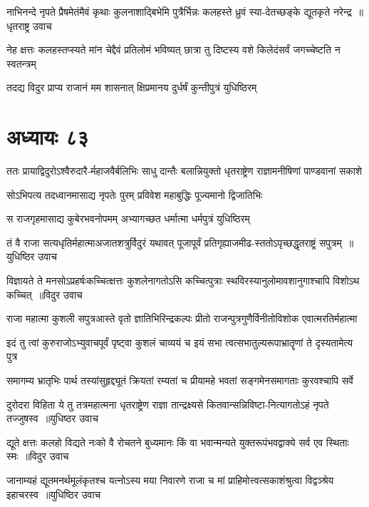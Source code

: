 \threelineshloka
{नाभिनन्दे नृपते प्रैषमेतंमैवं कृथाः कुलनाशाद्बिभेमि}
{पुत्रैर्भिन्नः कलहस्ते ध्रुवं स्या-देतच्छङ्के द्यूतकृते नरेन्द्र ॥धृतराष्ट्र उवाच}
{}


\twolineshloka
{नेह क्षत्तः कलहस्तप्स्यते मांन चेद्दैवं प्रतिलोमं भविष्यत्}
{छात्रा तु दिष्टस्य वशे किलेदंसर्वं जगच्चेष्टति न स्वतन्त्रम्}


\twolineshloka
{तदद्य विदुर प्राप्य राजानं मम शासनात्}
{क्षिप्रमानय दुर्धर्षं कुन्तीपुत्रं युधिष्ठिरम्}


\chapter{अध्यायः ८३}
\twolineshloka
{ततः प्रायाद्विदुरोऽश्वैरुदारै-र्महाजवैर्बलिभिः साधु दान्तैः}
{बलान्नियुक्तो धृतराष्ट्रेण राज्ञामनीषिणां पाण्डवानां सकाशे}


\twolineshloka
{सोऽभिपत्य तदध्वानमासाद्य नृपतेः पुरम्}
{प्रविवेश महाबुद्धिः पूज्यमानो द्विजातिभिः}


\twolineshloka
{स राजगृहमासाद्य कुबेरभवनोपमम्}
{अभ्यागच्छत धर्मात्मा धर्मपुत्रं युधिष्ठिरम्}


\twolineshloka
{तं वै राजा सत्यधृतिर्महात्माअजातशत्रुर्विदुरं यथावत्}
{पूजापूर्वं प्रतिगृह्याजमीढ-स्ततोऽपृच्छद्धृतराष्ट्रं सपुत्रम् ॥युधिष्ठिर उवाच}


\twolineshloka
{विज्ञायते ते मनसोऽप्रहर्षःकच्चित्क्षत्तः कुशलेनागतोऽसि}
{कच्चित्पुत्राः स्थविरस्यानुलोमावशानुगाश्चापि विशोऽथ कच्चित् ॥विदुर उवाच}


\twolineshloka
{राजा महात्मा कुशली सपुत्रआस्ते वृतो ज्ञातिभिरिन्द्रकल्पः}
{प्रीतो राजन्पुत्रगुणैर्विनीतोविशोक एवात्मरतिर्महात्मा}


\twolineshloka
{इदं तु त्वां कुरुराजोऽभ्युवाचपूर्वं पृष्ट्वा कुशलं चाव्ययं च}
{इयं सभा त्वत्सभातुल्यरूपाभ्रातॄणां ते दृस्यतामेत्य पुत्र}


\twolineshloka
{समागम्य भ्रातृभिः पार्थ तस्यांसुहृद्द्यूतं क्रियतां रम्यतां च}
{प्रीयामहे भवतां सङ्गमेनसमागताः कुरवश्चापि सर्वे}


\twolineshloka
{दुरोदरा विहिता ये तु तत्रमहात्मना धृतराष्ट्रेण राज्ञा}
{तान्द्रक्ष्यसे कितवान्सन्निविष्टा-नित्यागतोऽहं नृपते तज्जुषस्व ॥युधिष्ठर उवाच}


\twolineshloka
{द्यूते क्षत्तः कलहो विद्यते नःको वै रोचतने बुध्यमानः}
{किं वा भवान्मन्यते युक्तरूपंभवद्वाक्ये सर्व एव स्थिताः स्मः ॥विदुर उवाच}


\twolineshloka
{जानाम्यहं द्यूतमनर्थमूलंकृतश्च यत्नोऽस्य मया निवारणे}
{राजा च मां प्राहिमोत्त्वत्सकाशंश्रुत्वा विद्वञ्श्रेय इहाचरस्व ॥युधिष्ठिर उवाच}


